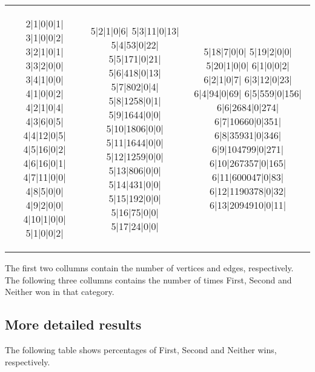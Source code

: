 \begin{tabular}{c | c | c}
\begin{minipage}{1.0in}
\begin{output}
2|1|0|0|1|
3|1|0|0|2|
3|2|1|0|1|
3|3|2|0|0|
3|4|1|0|0|
4|1|0|0|2|
4|2|1|0|4|
4|3|6|0|5|
4|4|12|0|5|
4|5|16|0|2|
4|6|16|0|1|
4|7|11|0|0|
4|8|5|0|0|
4|9|2|0|0|
4|10|1|0|0|
5|1|0|0|2|
\end{output}
\end{minipage}
&
\begin{minipage}{1.0in}
\begin{output}
5|2|1|0|6|
5|3|11|0|13|
5|4|53|0|22|
5|5|171|0|21|
5|6|418|0|13|
5|7|802|0|4|
5|8|1258|0|1|
5|9|1644|0|0|
5|10|1806|0|0|
5|11|1644|0|0|
5|12|1259|0|0|
5|13|806|0|0|
5|14|431|0|0|
5|15|192|0|0|
5|16|75|0|0|
5|17|24|0|0|
\end{output}
\end{minipage}
&
\begin{minipage}{1.0in}
\begin{output}
5|18|7|0|0|
5|19|2|0|0|
5|20|1|0|0|
6|1|0|0|2|
6|2|1|0|7|
6|3|12|0|23|
6|4|94|0|69|
6|5|559|0|156|
6|6|2684|0|274|
6|7|10660|0|351|
6|8|35931|0|346|
6|9|104799|0|271|
6|10|267357|0|165|
6|11|600047|0|83|
6|12|1190378|0|32|
6|13|2094910|0|11|
\end{output}
\end{minipage}
\\
\end{tabular}

The first two collumns contain the number of vertices and edges, respectively. The following three collumns contains the number of times First, Second and Neither won in that category.

\subsection{More detailed results}

The following table shows percentages of First, Second and Neither wins, respectively.

